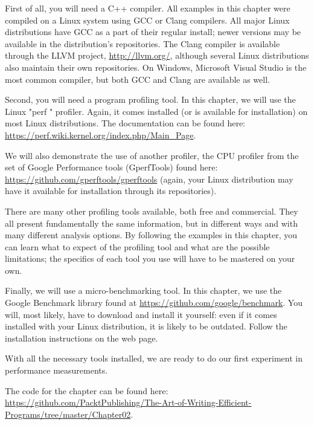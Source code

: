 First of all, you will need a C++ compiler. All examples in this chapter were compiled on a Linux system using GCC or Clang compilers. All major Linux distributions have GCC as a part of their regular install; newer versions may be available in the distribution's repositories. The Clang compiler is available through the LLVM project, \url{http://llvm.org/}, although several Linux distributions also maintain their own repositories. On Windows, Microsoft Visual Studio is the most common compiler, but both GCC and Clang are available as well.

Second, you will need a program profiling tool. In this chapter, we will use the Linux "perf " profiler. Again, it comes installed (or is available for installation) on most Linux distributions. The documentation can be found here: \url{https://perf.wiki.kernel.org/index.php/Main_Page}.

We will also demonstrate the use of another profiler, the CPU profiler from the set of Google Performance tools (GperfTools) found here: \url{https://github.com/gperftools/gperftools} (again, your Linux distribution may have it available for installation through its repositories).

There are many other profiling tools available, both free and commercial. They all present fundamentally the same information, but in different ways and with many different analysis options. By following the examples in this chapter, you can learn what to expect of the profiling tool and what are the possible limitations; the specifics of each tool you use will have to be mastered on your own.

Finally, we will use a micro-benchmarking tool. In this chapter, we use the Google Benchmark library found at \url{https://github.com/google/benchmark}. You will, most likely, have to download and install it yourself: even if it comes installed with your Linux distribution, it is likely to be outdated. Follow the installation instructions on the web page.

With all the necessary tools installed, we are ready to do our first experiment in performance measurements.

The code for the chapter can be found here: \url{https://github.com/PacktPublishing/The-Art-of-Writing-Efficient-Programs/tree/master/Chapter02}.



